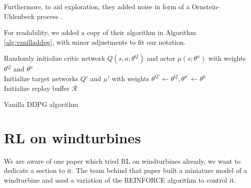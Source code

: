 \documentclass[hyperref,beleg]{cgvpub}
\begin{document}
Furthermore, to aid exploration, they added noise in form of a Ornstein-Uhlenbeck process \cite{uhlenbeckTheoryBrownianMotion1930}.

For readability, we added a copy of their algorithm in Algorithm \ref{alg:vanilladdpg}, with minor adjustments to fit our notation.

\begin{algorithm}
\SetAlgoLined
Randomly initialize critic network $Q(s, a;\theta^Q)$ and actor $\mu(s;\theta^{\mu})$ with weights $\theta^Q$ and $\theta^{\mu}$\\
Initialize target networks $Q'$ and $\mu'$ with weights $\theta^{Q'} \leftarrow \theta^Q, \theta^{\mu'} \leftarrow \theta^{\mu}$\\
Initialize replay buffer $\mathcal{R}$\\

\caption{Vanilla DDPG algorithm}
\label{alg:vanilladdpg}
\end{algorithm}

\section{RL on windturbines}
We are aware of one paper \cite{kolterDesignAnalysisLearning2012} which tried RL on windturbines already, we want to dedicate a section to it. The team behind that paper built a miniature model of a windturbine and used a variation of the \ac{REINFORCE} algorithm to control it.
\end{document}
